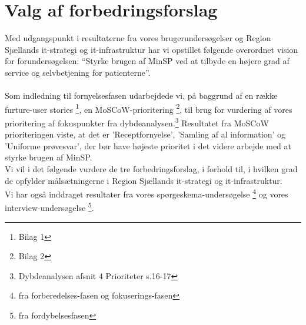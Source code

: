 %
%
%
%
%
%
%
%
%
%
%
%
%
%
%
%
%
%
%
%
%
%
%
%
%
%
%
%
%
\section{Valg af forbedringsforslag}
Med udgangspunkt i resultaterne fra vores brugerundersøgelser og Region Sjællands it-strategi og it-infrastruktur har vi opstillet følgende overordnet vision for forundersøgelsen: “Styrke brugen af MinSP ved at tilbyde en højere grad af service og selvbetjening for patienterne”.\\
\\
Som indledning til fornyelsesfasen udarbejdede vi, på baggrund af en række furture-user stories \footnote{Bilag 1}, en MoSCoW-prioritering \footnote{Bilag 2}, til brug for vurdering af vores prioritering af fokuspunkter fra dybdeanalysen.\footnote{Dybdeanalysen afsnit 4 Prioriteter s.16-17}
Resultatet fra MoSCoW prioriteringen viste, 
at det er 'Receptfornyelse', 'Samling af al information' og 'Uniforme prøvesvar', der bør have højeste prioritet i det videre arbejde med at styrke brugen af MinSP.\\  %
Vi vil i det følgende vurdere de tre forbedringsforslag, i forhold til,
i hvilken grad de opfylder målsætningerne i Region Sjællands it-strategi og it-infrastruktur. \\
Vi har også inddraget resultater fra vores spørgeskema-undersøgelse \footnote{fra forberedelses-fasen og fokuserings-fasen} og vores interview-undersøgelse \footnote{fra fordybelsesfasen}.
